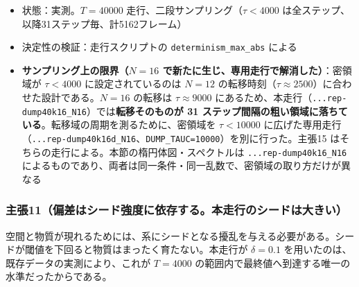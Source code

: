 \documentclass[
  10pt,
]{ltjsarticle}
\providecommand{\tightlist}{%
  \setlength{\itemsep}{0pt}\setlength{\parskip}{0pt}}
\begin{document}
\begin{itemize}
\tightlist
\item
  状態：実測。\(T = 40000\) 走行、二段サンプリング（\(\tau < 4000\)
  は全ステップ、以降31ステップ毎、計5162フレーム）
\item
  決定性の検証：走行スクリプトの \texttt{determinism\_max\_abs} による
\item
  \textbf{サンプリング上の限界（\(N=16\)
  で新たに生じ、専用走行で解消した）}：密領域が \(\tau < 4000\)
  に設定されているのは \(N=12\)
  の転移時刻（\(\tau\approx2500\)）に合わせた設計である。\(N=16\)
  の転移は \(\tau\approx9000\)
  にあるため、本走行（\texttt{...rep-dump40k16\_N16}）では\textbf{転移そのものが
  31
  ステップ間隔の粗い領域に落ちている}。転移域の周期を測るために、密領域を
  \(\tau<10000\)
  に広げた専用走行（\texttt{...rep-dump40k16d\_N16}、\texttt{DUMP\_TAUC=10000}）を別に行った。主張15
  はそちらの走行による。本節の楕円体図・スペクトルは
  \texttt{...rep-dump40k16\_N16}
  によるものであり、両者は同一条件・同一乱数で、密領域の取り方だけが異なる
\end{itemize}

\subsubsection{主張11（偏差はシード強度に依存する。本走行のシードは大きい）}\label{ux4e3bux5f3511ux504fux5deeux306fux30b7ux30fcux30c9ux5f37ux5ea6ux306bux4f9dux5b58ux3059ux308bux672cux8d70ux884cux306eux30b7ux30fcux30c9ux306fux5927ux304dux3044}

空間と物質が現れるためには、系にシードとなる擾乱を与える必要がある。シードが閾値を下回ると物質はまったく育たない。本走行が
\(\delta = 0.1\) を用いたのは、既存データの実測により、これが
\(T = 4000\) の範囲内で最終値へ到達する唯一の水準だったからである。
\end{document}
